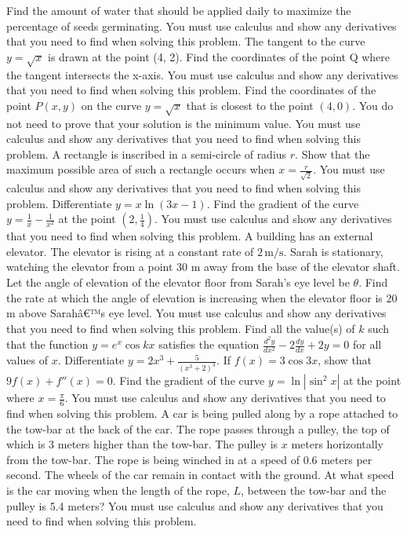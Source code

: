 \documentclass[12pt,addpoints]{exam}
\begin{document}
\begin{questions}
Find the amount of water that should be applied daily to maximize the percentage of seeds germinating. You must use calculus and show any derivatives that you need to find when solving this problem.
\fillwithlines{5cm}
\question[5] The tangent to the curve \( y = \sqrt{x} \) is drawn at the point (4, 2). Find the coordinates of the point Q where the tangent intersects the x-axis. You must use calculus and show any derivatives that you need to find when solving this problem.
\fillwithlines{5cm}
\question[5] Find the coordinates of the point \( P(x, y) \) on the curve \( y = \sqrt{x} \) that is closest to the point \( (4, 0) \). You do not need to prove that your solution is the minimum value. You must use calculus and show any derivatives that you need to find when solving this problem.
\fillwithlines{5cm}
\question[5] A rectangle is inscribed in a semi-circle of radius \( r \). Show that the maximum possible area of such a rectangle occurs when \( x = \frac{r}{\sqrt{2}} \). You must use calculus and show any derivatives that you need to find when solving this problem.
\fillwithlines{5cm}
\question[5] Differentiate \( y = x \ln(3x - 1) \).
\fillwithlines{5cm}
\question[5] Find the gradient of the curve \( y = \frac{1}{x} - \frac{1}{x^2} \) at the point \( \left( 2, \frac{1}{4} \right) \). You must use calculus and show any derivatives that you need to find when solving this problem.
\fillwithlines{5cm}
\question[5] A building has an external elevator. The elevator is rising at a constant rate of \(2 \, \text{m/s}\). Sarah is stationary, watching the elevator from a point 30 m away from the base of the elevator shaft. Let the angle of elevation of the elevator floor from Sarah's eye level be \(\theta\). Find the rate at which the angle of elevation is increasing when the elevator floor is 20 m above Sarahâ€™s eye level. You must use calculus and show any derivatives that you need to find when solving this problem.
\fillwithlines{5cm}
\question[5] Find all the value(s) of \( k \) such that the function \( y = e^x \cos kx \) satisfies the equation \(\frac{d^2y}{dx^2} - 2 \frac{dy}{dx} + 2y = 0\) for all values of \( x \).
\fillwithlines{5cm}
\question[5] Differentiate \( y = 2x^3 + \frac{5}{(x^3 + 2)^3} \).
\fillwithlines{5cm}
\question[5] If \( f(x) = 3 \cos 3x \), show that \( 9f(x) + f''(x) = 0 \).
\fillwithlines{5cm}
\question[5] Find the gradient of the curve \( y = \ln |\sin^2 x| \) at the point where \( x = \frac{\pi}{6} \). You must use calculus and show any derivatives that you need to find when solving this problem.
\fillwithlines{5cm}
\question[5] A car is being pulled along by a rope attached to the tow-bar at the back of the car. The rope passes through a pulley, the top of which is 3 meters higher than the tow-bar. The pulley is \( x \) meters horizontally from the tow-bar. The rope is being winched in at a speed of 0.6 meters per second. The wheels of the car remain in contact with the ground. At what speed is the car moving when the length of the rope, \( L \), between the tow-bar and the pulley is 5.4 meters? You must use calculus and show any derivatives that you need to find when solving this problem.

\end{questions}
\end{document}
